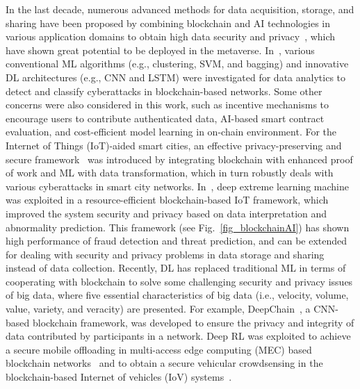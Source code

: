 \documentclass[journal]{IEEEtran}
\begin{document}
In the last decade, numerous advanced methods for data acquisition, storage, and sharing have been proposed by combining blockchain and AI technologies in various application domains to obtain high data security and privacy~\cite{liu2020blockchain}, which have shown great potential to be deployed in the metaverse.
In~\cite{tanwar2019machine}, various conventional ML algorithms (e.g., clustering, SVM, and bagging) and innovative DL architectures (e.g., CNN and LSTM) were investigated for data analytics to detect and classify cyberattacks in blockchain-based networks. Some other concerns were also considered in this work, such as incentive mechanisms to encourage users to contribute authenticated data, AI-based smart contract evaluation, and cost-efficient model learning in on-chain environment. 
For the Internet of Things (IoT)-aided smart cities, an effective privacy-preserving and secure framework~\cite{kumar2021ppsf} was introduced by integrating blockchain with enhanced proof of work and ML with data transformation, which in turn robustly deals with various cyberattacks in smart city networks.
In~\cite{khan2021amachine}, deep extreme learning machine was exploited in a resource-efficient blockchain-based IoT framework, which improved the system security and privacy based on data interpretation and abnormality prediction.
This framework (see Fig.~\ref{fig_blockchainAI}) has shown high performance of fraud detection and threat prediction, and can be extended for dealing with security and privacy problems in data storage and sharing instead of data collection. 
Recently, DL has replaced traditional ML in terms of cooperating with blockchain to solve some challenging security and privacy issues of big data, where five essential characteristics of big data (i.e., velocity, volume, value, variety, and veracity) are presented.
For example, DeepChain~\cite{weng2021deepchain}, a CNN-based blockchain framework, was developed to ensure the privacy and integrity of data contributed by participants in a network.
Deep RL was exploited to achieve a secure mobile offloading in multi-access edge computing (MEC) based blockchain networks~\cite{nguyen2020privacy} and to obtain a secure vehicular crowdsensing in the blockchain-based Internet of vehicles (IoV) systems~\cite{wang2021secure}.
\end{document}
